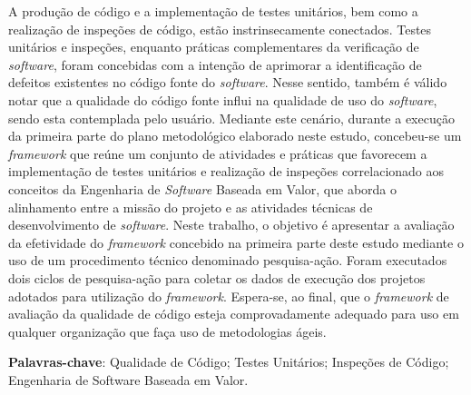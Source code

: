 \begin{resumo}
 
 A produção de código e a implementação de testes unitários, bem como a realização de inspeções de código, estão instrinsecamente conectados. Testes unitários e inspeções, enquanto práticas complementares da verificação de \textit{software}, foram concebidas com a intenção de aprimorar a identificação de defeitos existentes no código fonte do \textit{software}. Nesse sentido, também é válido notar que a qualidade do código fonte influi na qualidade de uso do \textit{software}, sendo esta contemplada pelo usuário. Mediante este cenário, durante a execução da primeira parte do plano metodológico elaborado neste estudo, concebeu-se um \textit{framework} que reúne um conjunto de atividades e práticas que favorecem a implementação de testes unitários e realização de inspeções correlacionado aos conceitos da Engenharia de \textit{Software} Baseada em Valor, que aborda o alinhamento entre a missão do projeto e as atividades técnicas de desenvolvimento de \textit{software}. Neste trabalho, o objetivo é apresentar a avaliação da efetividade do \textit{framework} concebido na primeira parte deste estudo mediante o uso de um procedimento técnico denominado pesquisa-ação. Foram executados dois ciclos de pesquisa-ação para coletar os dados de execução dos projetos adotados para utilização do \textit{framework}. Espera-se, ao final, que o \textit{framework} de avaliação da qualidade de código esteja comprovadamente adequado para uso em qualquer organização que faça uso de metodologias ágeis.

 \vspace{\onelineskip}
    
 \noindent
 \textbf{Palavras-chave}: Qualidade de Código; Testes Unitários; Inspeções de Código; Engenharia de Software Baseada em Valor.
\end{resumo}
